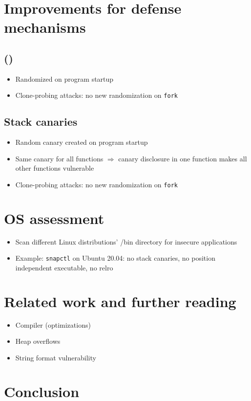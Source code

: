 \chapter{Improvements for defense mechanisms}
\label{chp:defense-mechanism-improvements}

\section{ ()}
\label{sec:aslr-improvements}

\begin{itemize}
	\item{Randomized on program startup}
	\item{Clone-probing attacks: no new randomization on \texttt{fork}}
\end{itemize}

\section{Stack canaries}
\label{sec:stack-canary-improvements}

\begin{itemize}
	\item{Random canary created on program startup}
	\item{Same canary for all functions $\Rightarrow$ canary disclosure in one function makes all other functions vulnerable}
	\item{Clone-probing attacks: no new randomization on \texttt{fork}}
\end{itemize}

\chapter{OS assessment}
\label{chp:os-assessment}

\begin{itemize}
	\item{Scan different Linux distributions' /bin directory for insecure applications}
	\item{Example: \texttt{snapctl} on Ubuntu 20.04: no stack canaries, no position independent executable, no \gls{relro}}
\end{itemize}
%

\chapter{Related work and further reading}
\label{chp:related-work}

\begin{itemize}
	\item{Compiler (optimizations)}
	\item{Heap overflows}
	\item{String format vulnerability}
\end{itemize}

\chapter{Conclusion}
\label{chp:conclusion}